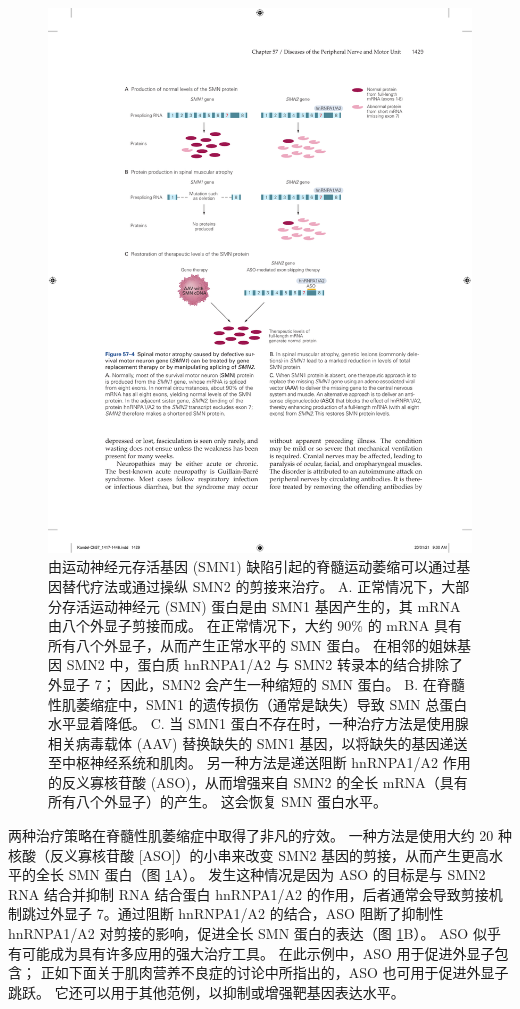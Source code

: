 \begin{figure}[htbp]
	\centering
	\includegraphics[width=0.8\linewidth]{chap57/fig_57_4}
	\caption{由运动神经元存活基因 (SMN1) 缺陷引起的脊髓运动萎缩可以通过基因替代疗法或通过操纵 SMN2 的剪接来治疗。 A. 正常情况下，大部分存活运动神经元 (SMN) 蛋白是由 SMN1 基因产生的，其 mRNA 由八个外显子剪接而成。 在正常情况下，大约 90\% 的 mRNA 具有所有八个外显子，从而产生正常水平的 SMN 蛋白。 在相邻的姐妹基因 SMN2 中，蛋白质 hnRNPA1/A2 与 SMN2 转录本的结合排除了外显子 7； 因此，SMN2 会产生一种缩短的 SMN 蛋白。 B. 在脊髓性肌萎缩症中，SMN1 的遗传损伤（通常是缺失）导致 SMN 总蛋白水平显着降低。 C. 当 SMN1 蛋白不存在时，一种治疗方法是使用腺相关病毒载体 (AAV) 替换缺失的 SMN1 基因，以将缺失的基因递送至中枢神经系统和肌肉。 另一种方法是递送阻断 hnRNPA1/A2 作用的反义寡核苷酸 (ASO)，从而增强来自 SMN2 的全长 mRNA（具有所有八个外显子）的产生。 这会恢复 SMN 蛋白水平。}
	\label{fig:57_4}
\end{figure}


两种治疗策略在脊髓性肌萎缩症中取得了非凡的疗效。 一种方法是使用大约 20 种核酸（反义寡核苷酸 [ASO]）的小串来改变 SMN2 基因的剪接，从而产生更高水平的全长 SMN 蛋白（图 \ref{fig:57_4}A）。 发生这种情况是因为 ASO 的目标是与 SMN2 RNA 结合并抑制 RNA 结合蛋白 hnRNPA1/A2 的作用，后者通常会导致剪接机制跳过外显子 7。通过阻断 hnRNPA1/A2 的结合，ASO 阻断了抑制性 hnRNPA1/A2 对剪接的影响，促进全长 SMN 蛋白的表达（图 \ref{fig:57_4}B）。
ASO 似乎有可能成为具有许多应用的强大治疗工具。
在此示例中，ASO 用于促进外显子包含；
正如下面关于肌肉营养不良症的讨论中所指出的，ASO 也可用于促进外显子跳跃。
它还可以用于其他范例，以抑制或增强靶基因表达水平。


